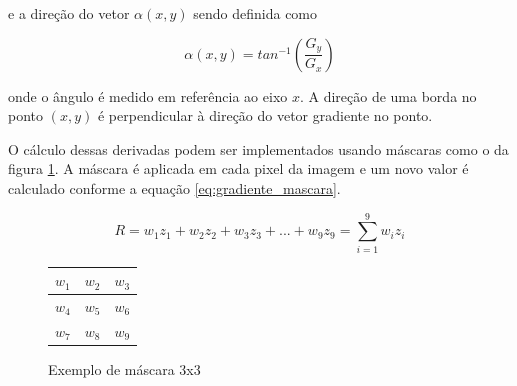 e a direção do vetor \(\alpha(x,y)\) sendo definida como

\begin{equation}
\alpha(x,y) = tan^{-1}
\left (
\dfrac{G_y}{G_x}
\right)
\end{equation}

onde o ângulo é medido em referência ao eixo \(x\). A direção de uma borda no ponto \((x,y)\) é perpendicular à direção do vetor gradiente no ponto.

O cálculo dessas derivadas podem ser implementados usando máscaras como o da figura \ref{fig:gradiente_mascara}. A máscara é aplicada em cada pixel da imagem e um novo valor é calculado conforme a equação \ref{eq:gradiente_mascara}.

\begin{equation}
R = w_1 z_1 + w_2 z_2 + w_3 z_3 + ... +w_9 z_9 = \sum_{i=1}^{9}{w_iz_i}
\label{eq:gradiente_mascara}
\end{equation}

\begin{figure}
\begin{center}
\begin{tabular}{| l |c | r |}
\hline
\(w_1\) & \(w_2\) & \(w_3\) \\ \hline
\(w_4\) & \(w_5\) & \(w_6\) \\ \hline
\(w_7\) & \(w_8\) & \(w_9\) \\ \hline
\end{tabular}
\end{center}
\caption{Exemplo de máscara 3x3}
\label{fig:gradiente_mascara}
\end{figure}

